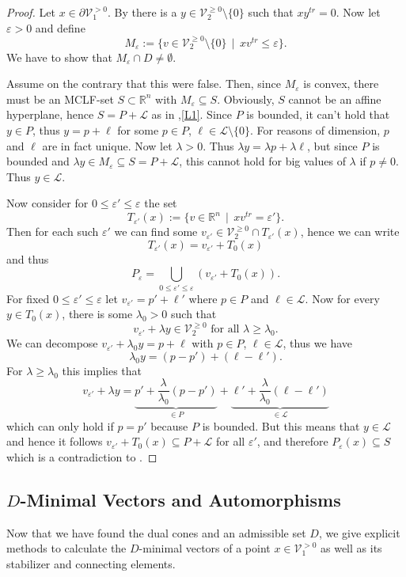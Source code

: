 \documentclass[10pt, preprint]{elsarticle}
\theoremstyle{definition}
\theoremstyle{definition}
\newcommand{\R}{\mathbb{R}}
\newcommand{\calL}{\mathcal{L}}
\newcommand{\V}{\mathcal{V}}
\newcommand{\eps}{\varepsilon}
\newcommand{\Vgt}{\V_1^{>0}}
\newcommand{\Wgeq}{\V_2^{\geq 0}}
\begin{document}
\begin{proof}
Let $x\in\partial\Vgt$. By \cite[Lemma 1.1]{Opg01} there is a $y\in\Wgeq\setminus\{0\}$ such that $xy^{tr}=0$. Now let $\eps >0$ and define
\[M_\eps:=\{v\in\Wgeq\setminus\{0\}\,\mid\, xv^{tr}\leq\eps\}.\]
We have to show that $M_\eps\cap D\neq\emptyset$.

Assume on the contrary that this were false. Then, since $M_\eps$ is convex, there must be an MCLF-set $S\subset\R^n$ with $M_\eps\subseteq S$. Obviously, $S$ cannot be an affine hyperplane, hence $S=P+\calL$ as in ,\ref{L1}. Since $P$ is bounded, it can't hold that $y\in P$, thus $y=p+\ell$ for some $p\in P$, $\ell\in\calL\setminus\{0\}$. For reasons of dimension, $p$ and $\ell$ are in fact unique. Now let $\lambda>0$. Thus $\lambda y=\lambda p+\lambda \ell$, but since $P$ is bounded and $\lambda y\in M_\eps\subseteq S=P+\calL$, this cannot hold for big values of $\lambda$ if $p\neq 0$. Thus $y\in\calL$.

Now consider for $0\leq\eps'\leq\eps$ the set
\[T_{\eps'}(x):=\{v\in\R^n\,\mid\, xv^{tr}=\eps'\}.\]
Then for each such $\eps'$ we can find some $v_{\eps'}\in\Wgeq\cap T_{\eps'}(x)$, hence we can write
\[T_{\eps'}(x)=v_{\eps'}+T_0(x)\] 
and thus 
\[P_\eps=\bigcup\limits_{0\leq\eps'\leq\eps} (v_{\eps'}+T_0(x)).\]
For fixed $0\leq \eps'\leq \eps$ let $v_{\eps'}=p'+\ell'$ where $p\in P$ and $\ell\in\calL$. Now for every $y\in T_0(x)$, there is some $\lambda_0> 0$ such that
\[v_{\eps'}+\lambda y\in\Wgeq\text{ for all }\lambda\geq\lambda_0.\]
We can decompose $v_{\eps'}+\lambda_0 y=p+\ell$ with $p\in P$, $\ell\in\calL$, thus we have 
\[\lambda_0 y=(p-p')+(\ell-\ell').\]
For $\lambda\geq\lambda_0$ this implies that
\[v_{\eps'}+\lambda y=\underbrace{p'+\frac{\lambda}{\lambda_0} (p-p')}_{\in P}+\underbrace{\ell'+\frac{\lambda}{\lambda_0}(\ell-\ell')}_{\in\calL}\]
which can only hold if $p=p'$ because $P$ is bounded. But this means that $y\in\calL$ and hence it follows $v_{\eps'}+T_0(x)\subseteq P+\calL$ for all $\eps'$, and therefore $P_\eps(x)\subseteq S$ which is a contradiction to .
\end{proof}
\subsection{$D$-Minimal Vectors and Automorphisms}
Now that we have found the dual cones and an admissible set $D$, we give explicit methods to calculate the $D$-minimal vectors of a point $x\in\Vgt$ as well as its stabilizer and connecting elements. 
\end{document}
